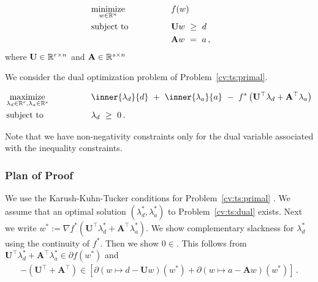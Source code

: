 
\begin{fproblem}
  \label{cv:ts:primal}
\begin{align*}
    &\underset{w \in \R^n}
    {\text{minimize}}
    &&\qquad\qquad
    f(w)
    &&&
    \\
    &\text{subject to}
    &&\qquad\qquad
    \mathbf{U}w
    \ 
    \ge
    \ 
    d
    \\
    &
    &&\qquad\qquad
    \mathbf{A}w
    \ 
    =
    \ 
    a
    \,,
\end{align*}
where 
$\mathbf{U}\in \mathbb{R}^{r\times n}$
and
$\mathbf{A}\in \mathbb{R}^{s\times n}$
\end{fproblem}
We consider the dual optimization problem of Problem~\ref{cv:ts:primal}.
\begin{fproblem}
  \label{cv:ts:dual}
  \begin{alignat*}{2}
    &\underset{
    \lambda_d \in \R^r
,
    \lambda_a \in \R^s
  }
    {\text{maximize}}
    &&\qquad\qquad
    \inner
    {\lambda_d}
    {d}
    \ 
    +
    \ 
    \inner
    {\lambda_a}
    {a}
    \ 
    -
    \ 
    f^*
    \left( 
      \mathbf{U}^\top  \lambda_d
      +
      \mathbf{A}^\top  \lambda_a
    \right)
    \\
    &\text{subject to}
    &&\qquad\qquad
    \lambda_d
    \ 
    \ge
    \ 
    0
    \,.
\end{alignat*}
\end{fproblem}
Note that we have non-negativity constraints only for 
the dual variable associated with the inequality constraints.
\subsubsection*{Plan of Proof}
We use the Karush-Kuhn-Tucker conditions for 
Problem~\ref{cv:ts:primal}
.
We assume that an optimal solution 
$(\lambda_d^*,\lambda_a^*)$
to 
Problem~\ref{cv:ts:dual}
exists.
Next we write
$
  w^*
  :=
  \nabla
    f^*
    \left( 
      \mathbf{U}^\top  \lambda_d^*
      +
      \mathbf{A}^\top  \lambda_a^*
    \right)
$.
We show complementary slackness for $\lambda_d^*$ using the continuity
of $f^*$.
Then we show $0\in$.
This follows from
$
      \mathbf{U}^\top  \lambda_d^*
      +
      \mathbf{A}^\top  \lambda_a^*
      \in
\partial f (w^*)
$
and 
$
$
\begin{gather}
  -
  \left( 
      \mathbf{U}^\top  
      +
      \mathbf{A}^\top  
  \right)
  \in
  \left[ 
    \partial
    \left( 
      w
      \mapsto
      d
      -
      \mathbf{U}w
    \right)
    (w^*)
    +
    \partial
    \left( 
      w
      \mapsto
      a
      -
      \mathbf{A}w
    \right)
    (w^*)
  \right]
  \,.
\end{gather}


